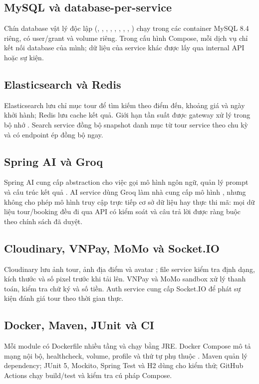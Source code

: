 \subsection{MySQL và database-per-service}
Chín database vật lý độc lập (, , , , , , , , ) chạy trong các container MySQL 8.4 riêng, có user/grant và volume riêng. Trong cấu hình Compose, mỗi dịch vụ chỉ kết nối database của mình; dữ liệu của service khác được lấy qua internal API hoặc sự kiện.

\subsection{Elasticsearch và Redis}
Elasticsearch lưu chỉ mục tour để tìm kiếm theo điểm đến, khoảng giá và ngày khởi hành; Redis lưu cache kết quả. Giới hạn tần suất được gateway xử lý trong bộ nhớ \cite{elastic,redis}. Search service đồng bộ snapshot danh mục từ tour service theo chu kỳ và có endpoint ép đồng bộ ngay.

\subsection{Spring AI và Groq}
Spring AI cung cấp abstraction cho việc gọi mô hình ngôn ngữ, quản lý prompt và cấu trúc kết quả \cite{springai}. AI service dùng Groq làm nhà cung cấp mô hình \cite{groq}, nhưng không cho phép mô hình truy cập trực tiếp cơ sở dữ liệu hay thực thi mã: mọi dữ liệu tour/booking đều đi qua API có kiểm soát và câu trả lời được ràng buộc theo chính sách đã duyệt.

\subsection{Cloudinary, VNPay, MoMo và Socket.IO}
Cloudinary lưu ảnh tour, ảnh địa điểm và avatar \cite{cloudinary}; file service kiểm tra định dạng, kích thước và số pixel trước khi tải lên. VNPay và MoMo sandbox xử lý thanh toán, kiểm tra chữ ký và số tiền. Auth service cung cấp Socket.IO để phát sự kiện đánh giá tour theo thời gian thực.

\subsection{Docker, Maven, JUnit và CI}
Mỗi module có Dockerfile nhiều tầng và chạy bằng JRE. Docker Compose mô tả mạng nội bộ, healthcheck, volume, profile và thứ tự phụ thuộc \cite{docker}. Maven quản lý dependency; JUnit 5, Mockito, Spring Test và H2 dùng cho kiểm thử; GitHub Actions chạy build/test và kiểm tra cú pháp Compose.

